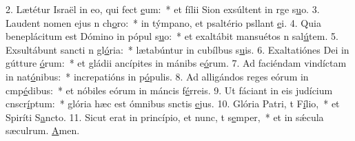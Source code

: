2. Lætétur Israël in eo, qui fect \uline{e}um:~* et fílii Sion exsúltent in rge s\uline{u}o.
3. Laudent nomen ejus n ch\uline{o}ro:~* in týmpano, et psaltério psllant \uline{e}i.
4. Quia beneplácitum est Dómino in pópul s\uline{u}o:~* et exaltábit mansuétos n sal\uline{ú}tem.
5. Exsultábunt sancti n gl\uline{ó}ria:~* lætabúntur in cubílbus s\uline{u}is.
6. Exaltatiónes Dei in gútture \uline{ó}rum:~* et gládii ancípites in mánibs e\uline{ó}rum.
7. Ad faciéndam vindíctam in nat\uline{ó}nibus:~* increpatións in p\uline{ó}pulis.
8. Ad alligándos reges eórum in cmp\uline{é}dibus:~* et nóbiles eórum in máncis f\uline{é}rreis.
9. Ut fáciant in eis judícium cnscr\uline{í}ptum:~* glória hæc est ómnibus snctis \uline{e}jus.
10. Glória Patri, t F\uline{í}lio,~* et Spiríti S\uline{a}ncto.
11. Sicut erat in princípio, et nunc, t s\uline{e}mper,~* et in sǽcula sæculrum. \uline{A}men.
